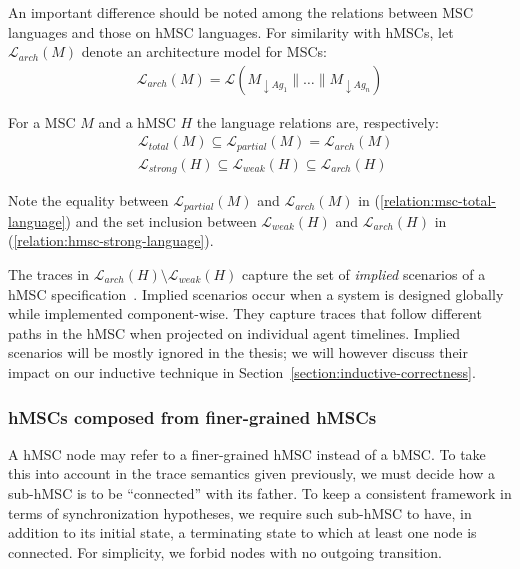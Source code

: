An important difference should be noted among the relations between MSC languages and those on hMSC languages. For similarity with hMSCs, let $\mathcal{L}_{arch}(M)$ denote an architecture model for MSCs:
\begin{align*}
\mathcal{L}_{arch}(M) = \mathcal{L}(M_{\downarrow Ag_1}\parallel\ldots\parallel M_{\downarrow Ag_n})
\end{align*}

\noindent For a MSC $M$ and a hMSC $H$ the language relations are, respectively:
\begin{align}
&\mathcal{L}_{total}(M) \subseteq \mathcal{L}_{partial}(M) = \mathcal{L}_{arch}(M) \label{relation:msc-total-language}\\
&\mathcal{L}_{strong}(H) \subseteq \mathcal{L}_{weak}(H) \subseteq \mathcal{L}_{arch}(H) \label{relation:hmsc-strong-language}
\end{align}

Note the equality between $\mathcal{L}_{partial}(M)$ and $\mathcal{L}_{arch}(M)$ in (\ref{relation:msc-total-language}) and the set inclusion between $\mathcal{L}_{weak}(H)$ and $\mathcal{L}_{arch}(H)$ in (\ref{relation:hmsc-strong-language}). 

The traces in $\mathcal{L}_{arch}(H) \setminus \mathcal{L}_{weak}(H)$ capture the set of \emph{implied} scenarios of a hMSC specification~\cite{Alur:2000, Uchitel:2004}. Implied scenarios occur when a system is designed globally while implemented component-wise. They capture traces that follow different paths in the hMSC when projected on individual agent timelines. Implied scenarios will be mostly ignored in the thesis; we will however discuss their impact on our inductive technique in Section~\ref{section:inductive-correctness}.

\subsubsection*{hMSCs composed from finer-grained hMSCs\label{subsubsection:hMSC-with-sub-hMSC}}

A hMSC node may refer to a finer-grained hMSC instead of a bMSC. To take this into account in the trace semantics given previously, we must decide how a sub-hMSC is to be ``connected'' with its father. To keep a consistent framework in terms of synchronization hypotheses, we require such sub-hMSC to have, in addition to its initial state, a terminating state to which at least one node is connected. For simplicity, we forbid nodes with no outgoing transition. 

